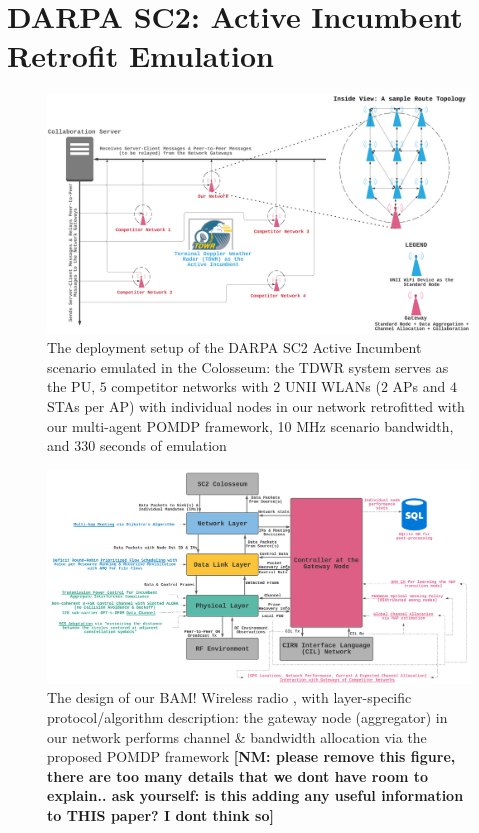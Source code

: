 \documentclass[12pt, draftcls, onecolumn]{IEEEtran}
\newcommand{\nm}[1]{{\color{blue}\bf{[NM: #1]}}}
\begin{document}
\section{DARPA SC2: Active Incumbent Retrofit Emulation}\label{Y}
\begin{figure} [htb]
    \centerline{
    \includegraphics[width = 0.8\linewidth]{figures/Minerva_Active_Incumbent_Deployment_Model_New.png}}
    \caption{The deployment setup of the DARPA SC2 Active Incumbent scenario emulated in the Colosseum: the TDWR system serves as the PU, $5$ competitor networks with $2$ UNII WLANs ($2$ APs and $4$ STAs per AP) with individual nodes in our network retrofitted with our multi-agent POMDP framework, 10 MHz scenario bandwidth, and 330 seconds of emulation \cite{DARPA:ActiveIncumbent}}
    \label{fig: Y. 0}
\end{figure}
\begin{figure} [htb]
    \centerline{
    \includegraphics[width = 0.8\linewidth]{figures/Minerva_Radio_Design_Model.png}}
    \caption{The design of our BAM! Wireless radio \cite{BAM}, with layer-specific protocol/algorithm description: the gateway node (aggregator) in our network performs channel \& bandwidth allocation via the proposed POMDP framework
    \nm{please remove this figure, there are too many details that we dont have room to explain.. ask yourself: is this adding any useful information to THIS paper? I dont think so}
    }
    \label{fig: Y. 1}
\end{figure}
\end{document}
